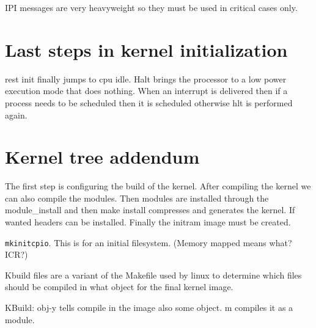 \documentclass[twoside]{article}
\begin{document}
IPI messages are very heavyweight so they must be used in critical cases only.

\section{Last steps in kernel initialization}
\label{sec:Last steps in kernel initialization}

rest init finally jumps to cpu idle. Halt brings the processor to a low power
execution mode that does nothing. When an interrupt is delivered then if a
process needs to be scheduled then it is scheduled otherwise hlt is performed
again.

\section{Kernel tree addendum}
\label{sec:Kernel tree addendum}

The first step is configuring the build of the kernel. After compiling the
kernel we can also compile the modules. Then modules are installed through
the module_install and then make install compresses and generates the kernel. 
If wanted headers can be installed. Finally the initram image must be created.

\texttt{mkinitcpio}. This is for an initial filesystem. (Memory mapped means
what? ICR?)

Kbuild files are a variant of the Makefile used by linux to determine which
files should be compiled in what object for the final kernel image. 

KBuild: obj-y tells compile in the image also some object. m compiles it as a
module. 

\newpage


\end{document}

